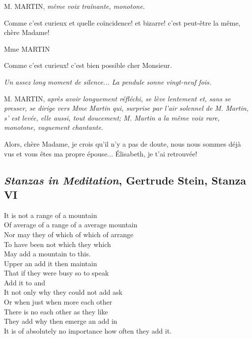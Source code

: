 \documentclass{article}
\begin{document}
			\begin{center}
				M. MARTIN, \textit{même voix traînante, monotone.}
			\end{center}
			Comme c'est curieux et quelle coïncidence! et
			bizarre! c'est peut-être la même, chère Madame!\\
			
			\begin{center}
				Mme MARTIN
			\end{center}
			Comme c'est curieux! c'est bien possible cher
			Monsieur.
			\begin{center}
				\textit{Un assez long moment de silence... La pendule
				sonne vingt-neuf fois.}\\
			\end{center}
			\begin{center}
				M. MARTIN, \textit{après avoir longuement réfléchi,
				se lève lentement et, sans se presser, se dirige
				vers Mme Martin qui, surprise par l'air solennel
				de M. Martin, s' est levée, elle aussi, tout doucement;
				M. Martin a la même voix rare,
				monotone, vaguement chantante.}
			\end{center}
			Alors, chère Madame, je crois qu'il n'y a pas de
			doute, nous nous sommes déjà vus et vous êtes ma
			propre épouse... Élisabeth, je t'ai retrouvée!
			\newpage
		\subsection{\textit{Stanzas in Meditation}, Gertrude Stein, {Stanza VI}}\label{stein_stanza}
			It is not a range of a mountain\\
			Of average of a range of a average mountain\\
			Nor may they of which of which of arrange\\
			To have been not which they which\\
			May add a mountain to this.\\
			Upper an add it then maintain\\
			That if they were busy so to speak\\
			Add it to and\\
			It not only why they could not add ask\\
			Or when just when more each other\\
			There is no each other as they like\\
			They add why then emerge an add in\\
			It is of absolutely no importance how often they add it.\\
			
		
\end{document}
